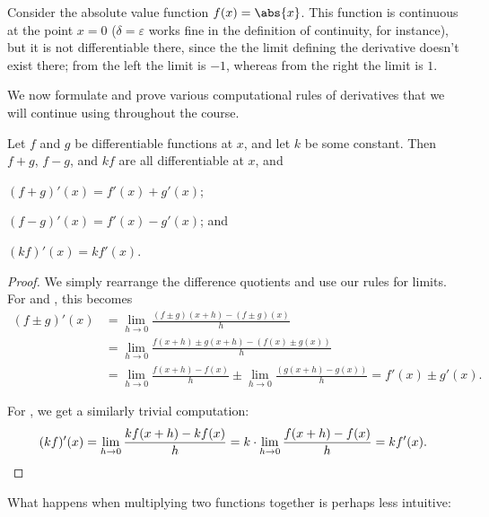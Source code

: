 \begin{counterexample}
	Consider the absolute value function $f(x) = \abs{x}$. This function is continuous at the point $x = 0$ ($\delta = \varepsilon$ works fine in the definition of continuity, for instance), but it is not differentiable there, since the the limit defining the derivative doesn't exist there; from the left the limit is $-1$, whereas from the right the limit is $1$.
\end{counterexample}

\noindent
We now formulate and prove various computational rules of derivatives that we will continue using throughout the course.

\begin{theorem}
	Let $f$ and $g$ be differentiable functions at $x$, and let $k$ be some constant. Then $f + g$, $f - g$, and $k f$ are all differentiable at $x$, and
	\begin{romanlist}
		\item $(f + g)'(x) = f'(x) + g'(x)$;
		\item $(f - g)'(x) = f'(x) - g'(x)$; and
		\item $(k f)'(x) = k f'(x)$.
	\end{romanlist}
\end{theorem}

\begin{proof}
	We simply rearrange the difference quotients and use our rules for limits. For  and , this becomes
	\begin{align*}
		(f \pm g)'(x) & = \lim_{h \to 0} \frac{(f \pm g)(x + h) - (f \pm g)(x)}{h}                                                   \\
		              & = \lim_{h \to 0} \frac{f(x + h) \pm g(x + h) - (f(x) \pm g(x))}{h}                                           \\
		              & = \lim_{h \to 0} \frac{f(x + h) - f(x)}{h} \pm \lim_{h \to 0} \frac{(g(x + h) - g(x))}{h} = f'(x) \pm g'(x).
	\end{align*}

	\noindent
	For , we get a similarly trivial computation:
	\[
		(k f)'(x) = \lim_{h \to 0} \frac{k f(x + h) - k f(x)}{h} = k \cdot \lim_{h \to 0} \frac{f(x + h) - f(x)}{h} = k f'(x). \qedhere
	\]
\end{proof}

\noindent
What happens when multiplying two functions together is perhaps less intuitive:

